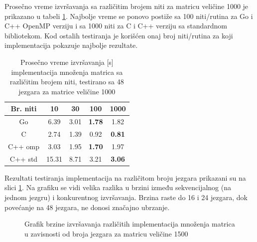 \documentclass[12pt,oneside]{memoir}
\begin{document}
Prosečno vreme izvršavanja sa različitim brojem niti za matricu veličine 1000 je prikazano u tabeli \ref{tab:matrix5}. Najbolje vreme se ponovo postiže sa 100 niti/rutina za Go i C++ OpenMP verziju i sa 1000 niti za C i C++ verziju sa standardnom bibliotekom. Kod ostalih testiranja je korišćen onaj broj niti/rutina za koji implementacija pokazuje najbolje rezultate. 
\\

\begin{table}
\begin{center}
\caption{Prosečno vreme izvršavanja [s] implementacija množenja matrica sa različitim brojem niti, testirano sa 48 jezgara za matrice veličine 1000}
\begin{tabular}{||c||c c c c||}
\hline
Br. niti		&10&30 &100 &1000\\ \hline
Go		&6.39	&3.01&\textbf{1.78}&1.82	 \\ \hline
C		&2.74	&1.39&0.92&\textbf{0.81} \\ \hline
C++ omp	&3.03	&1.95&\textbf{1.70}&1.97 \\ \hline
C++ std	&15.31&8.71&3.21&\textbf{3.06} \\ \hline
\end{tabular}
\label{tab:matrix5}
\end{center}
\end{table}

Rezultati testiranja implementacija na različitom broju jezgara prikazani su na slici \ref{fig:matrix3}. Na grafiku se vidi velika razlika u brzini između sekvencijalnog (na jednom jezgru) i konkurentnog izvršavanja. Brzina raste do 16 i 24 jezgara, dok povećanje na 48 jezgara, ne donosi značajno ubrzanje. 
\\

\begin{figure}
\begin{center}


\caption{Grafik brzine izvršavanja različitih implementacija množenja matrica u zavisnosti od broja jezgara za matricu veličine 1500}
\label{fig:matrix3}
\end{center}
\end{figure}
\end{document}
